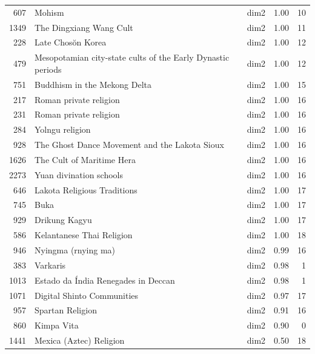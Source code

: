 \begin{tabular}{rllrr}
607 & Mohism & dim2 & 1.00 & 10 \\
1349 & The Dingxiang Wang Cult & dim2 & 1.00 & 11 \\
228 & Late Chosŏn Korea & dim2 & 1.00 & 12 \\
479 & Mesopotamian city-state cults of the Early Dynastic periods & dim2 & 1.00 & 12 \\
751 & Buddhism in the Mekong Delta & dim2 & 1.00 & 15 \\
217 & Roman private religion & dim2 & 1.00 & 16 \\
231 & Roman private religion & dim2 & 1.00 & 16 \\
284 & Yolngu religion & dim2 & 1.00 & 16 \\
928 & The Ghost Dance Movement and the Lakota Sioux & dim2 & 1.00 & 16 \\
1626 & The Cult of Maritime Hera & dim2 & 1.00 & 16 \\
2273 & Yuan divination schools & dim2 & 1.00 & 16 \\
646 & Lakota Religious Traditions & dim2 & 1.00 & 17 \\
745 & Buka & dim2 & 1.00 & 17 \\
929 & Drikung Kagyu & dim2 & 1.00 & 17 \\
586 & Kelantanese Thai Religion & dim2 & 1.00 & 18 \\
946 & Nyingma (rnying ma) & dim2 & 0.99 & 16 \\
383 & Varkaris & dim2 & 0.98 & 1 \\
1013 & Estado da Índia Renegades in Deccan & dim2 & 0.98 & 1 \\
1071 & Digital Shinto Communities & dim2 & 0.97 & 17 \\
957 & Spartan Religion & dim2 & 0.91 & 16 \\
860 & Kimpa Vita & dim2 & 0.90 & 0 \\
1441 & Mexica (Aztec) Religion & dim2 & 0.50 & 18 \\
\bottomrule
\end{tabular}
